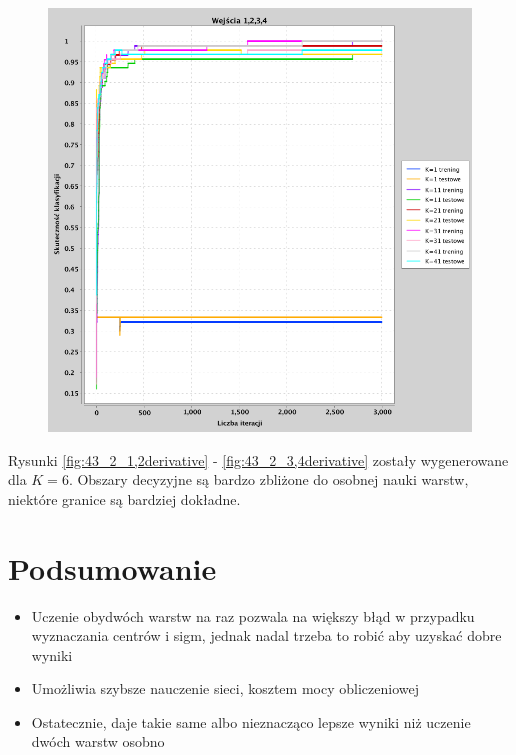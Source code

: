 \documentclass[a4paper, portrait,11pt]{article}
\begin{document}
\begin{figure}[!htb]
\begin{minipage}{0.33\textwidth}
    \caption{\label{fig:41_3_2,3,4derivative}}
  \end{minipage}
  \begin{minipage}{0.33\textwidth}
    \centering
    \includegraphics[width=1\linewidth]{../data/classification4/1/derivatives/4_1,2,3,4.png}
    \caption{\label{fig:41_4_1,2,3,4derivative}}
  \end{minipage}\hfill
\end{figure}


Rysunki \ref{fig:43_2_1,2derivative} - \ref{fig:43_2_3,4derivative} zostały wygenerowane dla $K=6$.
Obszary decyzyjne są bardzo zbliżone do osobnej nauki warstw, niektóre granice są bardziej dokładne.

\section{Podsumowanie}
\begin{itemize}
  \item Uczenie obydwóch warstw na raz pozwala na większy błąd w przypadku wyznaczania centrów i sigm, jednak nadal trzeba to robić aby uzyskać dobre wyniki
  \item Umożliwia szybsze nauczenie sieci, kosztem mocy obliczeniowej
  \item Ostatecznie, daje takie same albo nieznacząco lepsze wyniki niż uczenie dwóch warstw osobno
\end{itemize}
\end{document}
